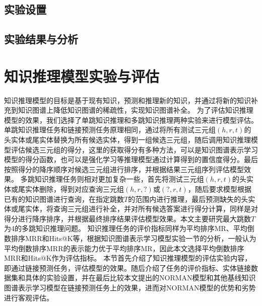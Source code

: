 \documentclass[algorithmlist, AutoFakeBold, AutoFakeSlant, figurelist, tablelist, nomlist, masters]{seuthesix}
\begin{document}
\subsection{实验设置}


\subsection{实验结果与分析}




\section{知识推理模型实验与评估}
知识推理模型的目标是基于现有知识，预测和推理新的知识，并通过将新的知识补充到知识图谱上降低知识图谱的稀疏性，实现知识图谱补全。
为了评估知识推理模型的效果，我们选择了单跳知识推理和多跳知识推理两种实验来进行模型评估。
单跳知识推理任务和链接预测任务原理相同，通过将所有测试三元组$\left(h, r, t\right)$的头实体或尾实体替换为所有候选实体，得到一组候选三元组，随后调用知识推理模型评估候选三元组的得分，这里的获取得分有多种方法，可以是知识图谱表示学习模型的得分函数，也可以是强化学习等推理模型通过计算得到的置信度得分。最后按照得分的降序顺序对候选三元组进行排序，并根据结果三元组序列评估模型效果。
多跳知识推理任务则相对更加复杂一些，首先将测试三元组$\left(h, r, t\right)$的头实体或尾实体删除，得到对应查询三元组$\left(h, r, ?\right)$或$\left(?, r, t\right)$，随后要求模型根据已有的知识图谱进行查询，在指定跳数$T$的范围内进行推理，最后预测缺失的头实体或尾实体，将查询三元组进行补全，并对所有候选答案进行得分计算，同样是对得分进行降序排序，并根据最终排序结果评估模型效果。本文主要研究最大跳数$T$为4的多跳知识推理问题。
知识推理任务的评价指标同样为平均排序MR、平均倒数排序MRR和Hits@K等，根据知识图谱表示学习模型实验一节的分析，一般认为平均倒数排序MRR的表示能力优于平均排序MR，因此本文选择平均倒数排序MRR和Hits@K作为评估指标。
本节首先介绍了知识推理模型的评估实验内容，即通过链接预测任务，评估模型的效果。随后介绍了任务的评价指标、实体链接数据集和具体的实验设置，并在最后比较本文提出的NORMAN模型和其他基线知识图谱表示学习模型在链接预测任务上的效果，进而对NORMAN模型的优势和劣势进行客观评估。
\end{document}
